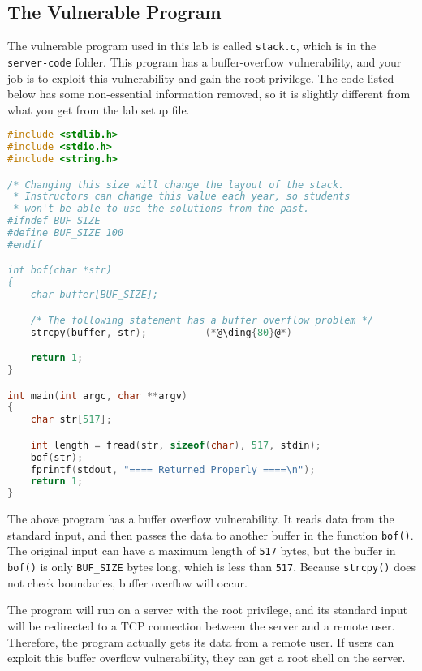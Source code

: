 \subsection{The Vulnerable Program} 

The vulnerable program used in this lab is called
\texttt{stack.c}, which is in the \texttt{server-code} folder.
This program has a buffer-overflow vulnerability,
and your job is to exploit this vulnerability and gain the root privilege.
The code listed below has some non-essential information removed,
so it is slightly different from what you get from the lab setup file.

\begin{lstlisting}[language=C, caption={The vulnerable program \texttt{stack.c}}]
#include <stdlib.h>
#include <stdio.h>
#include <string.h>

/* Changing this size will change the layout of the stack.
 * Instructors can change this value each year, so students
 * won't be able to use the solutions from the past.
#ifndef BUF_SIZE
#define BUF_SIZE 100
#endif

int bof(char *str)
{
    char buffer[BUF_SIZE];

    /* The following statement has a buffer overflow problem */ 
    strcpy(buffer, str);          (*@\ding{80}@*)

    return 1;
}

int main(int argc, char **argv)
{
    char str[517];

    int length = fread(str, sizeof(char), 517, stdin);
    bof(str);
    fprintf(stdout, "==== Returned Properly ====\n");
    return 1;
}
\end{lstlisting}

The above program has a buffer overflow vulnerability. It 
reads data from the standard input, and then passes the data
to another buffer in the function {\tt bof()}. The 
original input can have a maximum length of \texttt{517} bytes, but the buffer
in {\tt bof()} is only \texttt{BUF\_SIZE} bytes long, which is less than
\texttt{517}. Because {\tt strcpy()} does not check boundaries, 
buffer overflow will occur.

The program will run on a server with the root privilege, and its 
standard input will be redirected to a TCP connection between the
server and a remote user. 
Therefore, the program actually gets its data from a remote user. 
If users can exploit this buffer overflow vulnerability, 
they can get a root shell on the server. 



